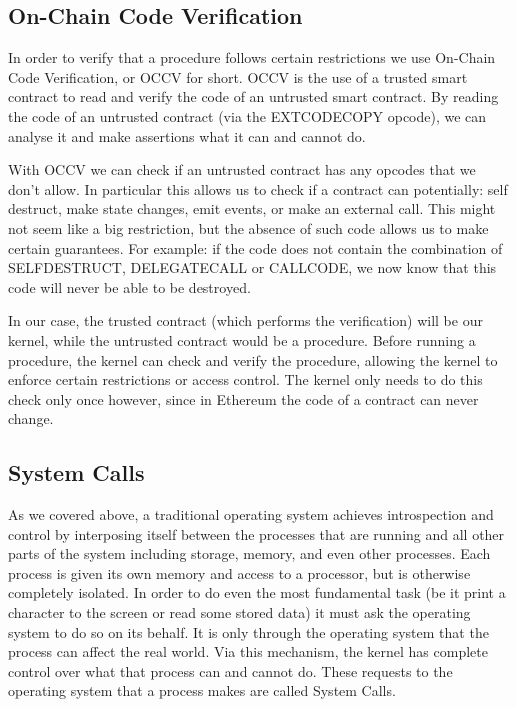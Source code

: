 \documentclass[english,a4paper]{article}
\begin{document}
\subsection{On-Chain Code
Verification}\label{on-chain-code-verification}
In order to verify that a procedure follows certain restrictions we use
On-Chain Code Verification, or OCCV for short. OCCV is the use of a
trusted smart contract to read and verify the code of an untrusted smart
contract. By reading the code of an untrusted contract (via the EXTCODECOPY
opcode), we can analyse it and make assertions what it can and cannot do.

With OCCV we can check if an untrusted contract has any opcodes that we
don't allow. In particular this allows us to check if a
contract can potentially: self destruct, make state changes, emit events,
or make an external call. This might not seem like a big restriction, but the
absence of
such code allows us to make certain guarantees. For example: if the code
does not contain the combination of SELFDESTRUCT, DELEGATECALL or
CALLCODE, we now know that this code will never be able to be destroyed.

In our case, the trusted contract (which performs the verification) will be our
kernel, while the
untrusted contract would be a procedure. Before running a procedure, the
kernel can check and verify the procedure, allowing the kernel to
enforce certain restrictions or access control. The kernel only needs to
do this check only once however, since in Ethereum the code of a
contract can never change.

\subsection{System Calls}\label{system-calls}
As we covered above, a traditional operating system achieves
introspection and control by interposing itself between the processes
that are running and all other parts of the system including storage,
memory, and even other processes. Each process is given its own memory
and access to a processor, but is otherwise completely isolated. In
order to do even the most fundamental task (be it print a character to
the screen or read some stored data) it must ask the operating system to
do so on its behalf. It is only through the operating system that the
process can affect the real world. Via this mechanism, the kernel has
complete control over what that process can and cannot do. These
requests to the operating system that a process makes are called System
Calls.
\end{document}
